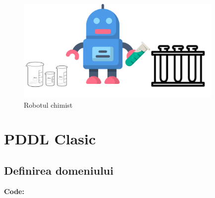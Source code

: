     \begin{figure}[htp]
    \centering
    \includegraphics[width=10cm]{text/images/chemrob.png}
    \caption{Robotul chimist}
    \label{fig:galaxy}
\end{figure}


\section{PDDL Clasic}
\subsection{Definirea domeniului}
\textbf{Code:}
\inputminted[linenos]{python}{code/ClassicPDDL/robchemy.pddl}

